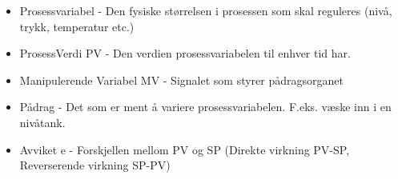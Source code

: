 \begin{itemize}
\item Prosessvariabel - Den fysiske størrelsen i prosessen som skal reguleres (nivå, trykk, temperatur etc.)
\item ProsessVerdi PV - Den verdien prosessvariabelen til enhver tid har.
\item Manipulerende Variabel MV - Signalet som styrer pådragsorganet
\item Pådrag - Det som er ment å variere prosessvariabelen. F.eks. væske inn i en nivåtank. 
\item Avviket e - Forskjellen mellom PV og SP (Direkte virkning PV-SP, Reverserende virkning SP-PV)
\end{itemize}











